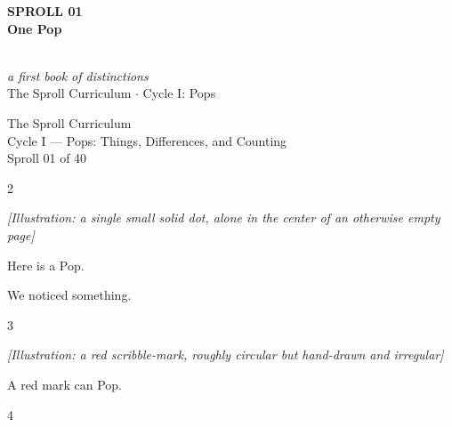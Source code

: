 \documentclass[12pt]{book}
\newcommand{\artnote}[1]{{\color{gray!70}\small\itshape [Illustration: #1]}\par\vspace{0.3in}}
\newcommand{\bigline}[1]{{\Huge #1}\par}
\newcommand{\pagenum}[1]{\vfill{\color{gray!50}\footnotesize #1}}
\newcommand{\sprollpage}{\newpage\vspace*{0.4in}}
\begin{document}
\thispagestyle{empty}
\begin{center}
\vspace*{1.2in}
{\Huge \textbf{SPROLL 01}}\\[0.4in]
{\huge \textbf{One Pop}}\\[0.6in]
\\[0.6in]
{\large \textit{a first book of distinctions}}\\[0.3in]
{\small The Sproll Curriculum $\cdot$ Cycle I: Pops}
\end{center}

\sprollpage
\begin{center}
\vspace*{1.5in}
{\Large The Sproll Curriculum}\\[0.2in]
{\normalsize Cycle I --- Pops: Things, Differences, and Counting}\\[0.6in]
{\small Sproll 01 of 40}
\end{center}
\pagenum{2}

\sprollpage
\begin{center}
\vspace*{0.6in}
\artnote{a single small solid dot, alone in the center of an otherwise empty page}
\bigline{Here is a Pop.}
\vspace{0.3in}
\vspace{0.3in}
\bigline{We noticed something.}
\end{center}
\pagenum{3}

\sprollpage
\begin{center}
\vspace*{0.6in}
\artnote{a red scribble-mark, roughly circular but hand-drawn and irregular}
\vspace{0.4in}
\bigline{A red mark can Pop.}
\end{center}
\pagenum{4}
\end{document}
